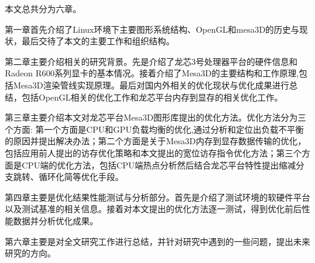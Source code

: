 
本文总共分为六章。

第一章首先介绍了Linux环境下主要图形系统结构、OpenGL和mesa3D的历史与现状，最后交待了本文的主要工作和组织结构。

第二章主要介绍相关的研究背景。先是介绍了龙芯3号处理器平台的硬件信息和Radeon R600系列显卡的基本情况。接着介绍了Mesa3D的主要结构和工作原理,包括Mesa3D渲染管线实现原理。最后对国内外相关的优化现状与优化成果进行总结，包括OpenGL相关的优化工作和龙芯平台内存到显存的相关优化工作。

第三章主要介绍本文对龙芯平台Mesa3D图形库提出的优化方法。优化方法分为三个方面: 第一个方面是CPU和GPU负载均衡的优化,通过分析和定位出负载不平衡的原因并提出解决办法；第二个方面是关于Mesa3D内存到显存数据传输的优化，包括应用前人提出的访存优化策略和本文提出的宽位访存指令优化方法；第三个方面是CPU端的优化方法，包括CPU端热点分析然后结合龙芯平台特性提出缩减分支跳转、循环化简等优化手段。

第四章主要是优化结果性能测试与分析部分。首先是介绍了测试环境的软硬件平台以及测试基准的相关信息。接着对本文提出的优化方法逐一测试，得到优化前后性能数据并分析优化成果。

第六章主要是对全文研究工作进行总结，并针对研究中遇到的一些问题，提出未来研究的方向。
